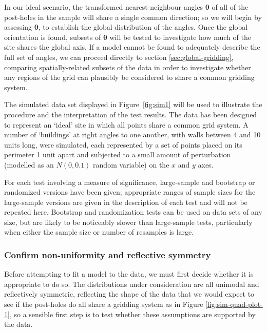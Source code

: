 \documentclass[../../ArchStats.tex]{subfiles}
\begin{document}
In our ideal scenario, the transformed nearest-neighbour angles $\boldsymbol{\theta}$ of all of the post-holes in the sample will share a single common direction; so we will begin by assessing $\boldsymbol{\theta}$, to establish the global distribution of the angles. Once the global orientation is found, subsets of $\boldsymbol{\theta}$ will be tested to investigate how much of the site shares the global axis. If a model cannot be found to adequately describe the full set of angles, we can proceed directly to section \ref{sec:global-gridding}, comparing spatially-related subsets of the data in order to investigate whether any regions of the grid can plausibly be considered to share a common gridding system.

The simulated data set displayed in Figure~\ref{fig:sim1} will be used to illustrate the procedure and the interpretation of the test results. The data has been designed to represent an `ideal' site in which all points share a common grid system. A number of `buildings' at right angles to one another, with walls between 4 and 10 units long, were simulated, each represented by a set of points placed on its perimeter 1 unit apart and subjected to a small amount of perturbation (modelled as an $N(0,0.1)$ random variable) on the $x$ and $y$ axes.

For each test involving a measure of significance, large-sample and bootstrap or randomized versions have been given; appropriate ranges of sample sizes for the large-sample versions are given in the description of each test and will not be repeated here. Bootstrap and randomization tests can be used on data sets of any size, but are likely to be noticeably slower than large-sample tests, particularly when either the sample size or number of resamples is large. 


\subsubsection{Confirm non-uniformity and reflective symmetry}
\label{sssec:unif-test}
Before attempting to fit a model to the data, we must first decide whether it is appropriate to do so. The distributions under consideration are all unimodal and reflectively symmetric, reflecting the shape of the data that we would expect to see if the post-holes do all share a gridding system as in Figure \ref{fig:sim-quad-plot-1}, so a sensible first step is to test whether these assumptions are supported by the data. 
\end{document}
